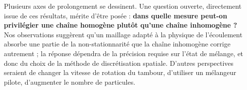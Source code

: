 \documentclass[french]{MemoireMaster}
\begin{document}
Plusieurs axes de prolongement se dessinent. Une question ouverte, directement issue de ces résultats, mérite d'être posée : \textbf{dans quelle mesure peut-on privilégier une chaîne homogène plutôt qu'une chaîne inhomogène ?} Nos observations suggèrent qu'un maillage adapté à la physique de l'écoulement absorbe une partie de la non-stationnarité que la chaîne inhomogène corrige autrement ; la réponse dépendra de la précision requise sur l'état de mélange, et donc du choix de la méthode de discrétisation spatiale. 
D'autres perspectives seraient de changer la vitesse de rotation du tambour, d'utiliser un mélangeur pilote, d'augmenter le nombre de particules.

\cleardoublepage
{}
{}
\printbibliography[
  heading=bibliographie,
  title={Références bibliographiques}
]

\cleardoublepage
\appendix
{}
{}
\end{document}
